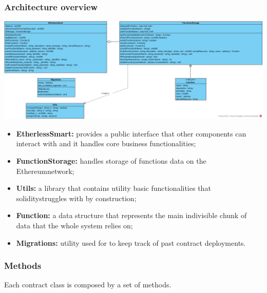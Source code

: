 \subsubsection{Architecture overview}
\includegraphics[width=\textwidth]{res/img/smart}
\begin{itemize}
	\item \textbf{EtherlessSmart:} provides a public interface that other components can interact with and it handles core business functionalities;
	\item \textbf{FunctionStorage:} handles storage of functions data on the Ethereum\glo network;
	\item \textbf{Utils:} a library that contains utility basic functionalities that solidity\glo struggles with by construction;
	\item \textbf{Function:} a data structure that represents the main indivisible chunk of data that the whole system relies on;
	\item \textbf{Migrations:} utility used for to keep track of past contract deployments.
\end{itemize}
\subsubsection{Methods}
Each contract class is composed by a set of methods.

